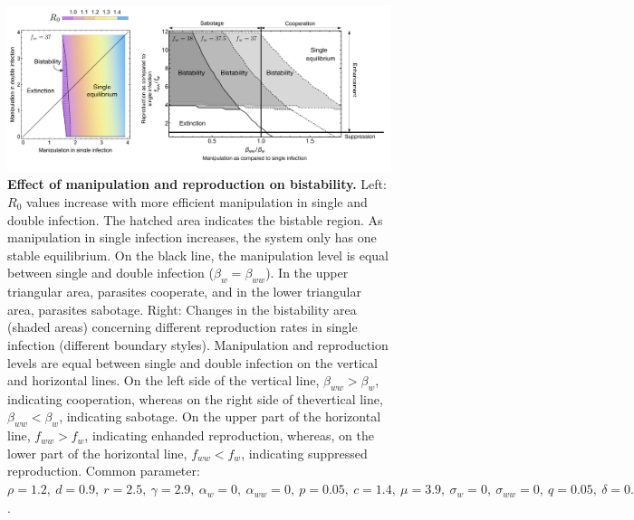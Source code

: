 \documentclass[a4paper]{scrartcl}
\begin{document}
\begin{figure}[!ht]
\captionsetup{format=plain}
\centering
\includegraphics[width=\textwidth]{Figures/ratio_reproduction_manipulation_combi.pdf}
\caption{\textbf{Effect of manipulation and reproduction on bistability.}
Left: $R_0$ values increase with more efficient manipulation in single and double infection.  
The hatched area indicates the bistable region. 
As manipulation in single infection increases, the system only has one stable equilibrium. 
On the black line, the manipulation level is equal between single and double infection ($\beta_w = \beta_{ww}$). 
In the upper triangular area, parasites cooperate, and in the lower triangular area, parasites sabotage.
Right: Changes in the bistability area (shaded areas) concerning different reproduction rates in single infection (different boundary styles). 
Manipulation and reproduction levels are equal between single and double infection on the vertical and horizontal lines. On the left side of the vertical line, $\beta_{ww} > \beta_{w}$, indicating cooperation, whereas on the right side of thevertical line, $\beta_{ww} < \beta_{w}$, indicating sabotage. On the upper part of the horizontal line, $f_{ww} > f_w$, indicating enhanded reproduction, whereas, on the lower part of the horizontal line, $f_{ww} < f_w$, indicating suppressed reproduction.
Common parameter:  $\rho = 1.2, \ d = 0.9, \ r = 2.5, \ \gamma = 2.9, \ \alpha_w = 0, \ \alpha_{ww} = 0, \ p = 0.05, \ c = 1.4, \ \mu = 3.9, \ \sigma_w = 0, \ \sigma_{ww} = 0, \ q = 0.05, \ \delta = 0.9, \ k = 0.26, \  \beta_w = 1.65, h = 0.6$.}
\label{fig:manipbifur}
\end{figure}
\end{document}
